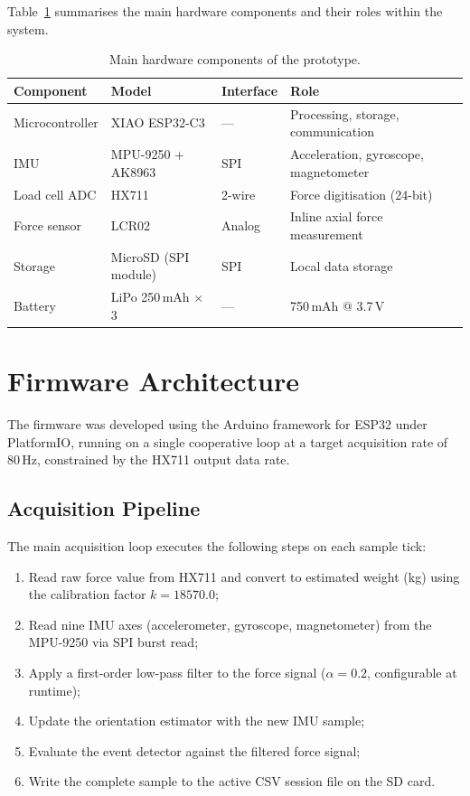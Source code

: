 Table~\ref{tab:hw_components} summarises the main hardware components
and their roles within the system.

\begin{table}[h]
  \centering
  \caption{Main hardware components of the prototype.}
  \label{tab:hw_components}
  \begin{tabular}{llll}
    \toprule
    \textbf{Component} & \textbf{Model} & \textbf{Interface} & \textbf{Role} \\
    \midrule
    Microcontroller     & XIAO ESP32-C3        & ---   & Processing, storage, communication \\
    IMU                 & MPU-9250 + AK8963    & SPI   & Acceleration, gyroscope, magnetometer \\
    Load cell ADC       & HX711                & 2-wire & Force digitisation (24-bit) \\
    Force sensor        & LCR02                & Analog & Inline axial force measurement \\
    Storage             & MicroSD (SPI module) & SPI   & Local data storage \\
    Battery             & LiPo 250\,mAh $\times$3 & --- & 750\,mAh @ 3.7\,V \\
    \bottomrule
  \end{tabular}
\end{table}

\section{Firmware Architecture}
\label{section:fw_architecture}

The firmware was developed using the Arduino framework for ESP32 under
PlatformIO, running on a single cooperative loop at a target acquisition
rate of 80\,Hz, constrained by the HX711 output data rate.

\subsection{Acquisition Pipeline}

The main acquisition loop executes the following steps on each sample tick:
\begin{enumerate}
  \item Read raw force value from HX711 and convert to estimated weight (kg)
      using the calibration factor $k = 18570.0$;
  \item Read nine IMU axes (accelerometer, gyroscope, magnetometer) from the
      MPU-9250 via SPI burst read;
  \item Apply a first-order low-pass filter to the force signal
      ($\alpha = 0.2$, configurable at runtime);
  \item Update the orientation estimator with the new IMU sample;
  \item Evaluate the event detector against the filtered force signal;
  \item Write the complete sample to the active CSV session file on the SD card.
\end{enumerate}


